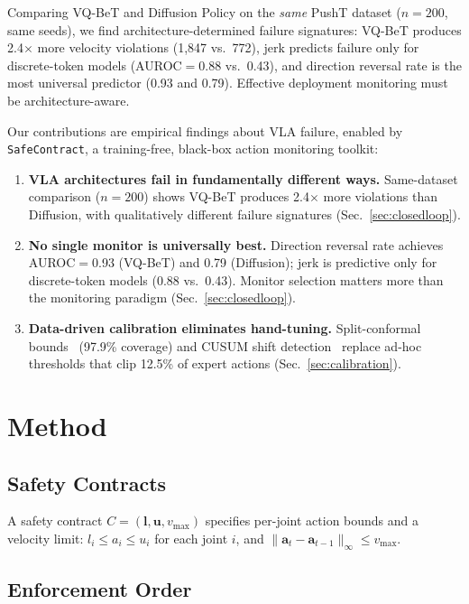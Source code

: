 \documentclass[conference]{IEEEtran}
\begin{document}
Comparing VQ-BeT and Diffusion Policy on the \emph{same} PushT dataset ($n{=}200$, same seeds), we find architecture-determined failure signatures: VQ-BeT produces 2.4$\times$ more velocity violations (1{,}847 vs.\ 772), jerk predicts failure only for discrete-token models (AUROC${=}$0.88 vs.\ 0.43), and direction reversal rate is the most universal predictor (0.93 and 0.79).
Effective deployment monitoring must be architecture-aware.

Our contributions are empirical findings about VLA failure, enabled by \texttt{SafeContract}, a training-free, black-box action monitoring toolkit:
\begin{enumerate}
    \item \textbf{VLA architectures fail in fundamentally different ways.} Same-dataset comparison ($n{=}200$) shows VQ-BeT produces 2.4$\times$ more violations than Diffusion, with qualitatively different failure signatures (Sec.~\ref{sec:closedloop}).
    \item \textbf{No single monitor is universally best.} Direction reversal rate achieves AUROC${=}$0.93 (VQ-BeT) and 0.79 (Diffusion); jerk is predictive only for discrete-token models (0.88 vs.\ 0.43). Monitor selection matters more than the monitoring paradigm (Sec.~\ref{sec:closedloop}).
    \item \textbf{Data-driven calibration eliminates hand-tuning.} Split-conformal bounds~\cite{vovk2005} (97.9\% coverage) and CUSUM shift detection~\cite{page1954} replace ad-hoc thresholds that clip 12.5\% of expert actions (Sec.~\ref{sec:calibration}).
\end{enumerate}

\section{Method}

\subsection{Safety Contracts}

A safety contract $C = (\mathbf{l}, \mathbf{u}, v_{\max})$ specifies per-joint action bounds and a velocity limit:
$l_i \leq a_i \leq u_i$ for each joint $i$, and $\|\mathbf{a}_t - \mathbf{a}_{t-1}\|_\infty \leq v_{\max}$.

\subsection{Enforcement Order}
\label{sec:enforcement}
\end{document}
